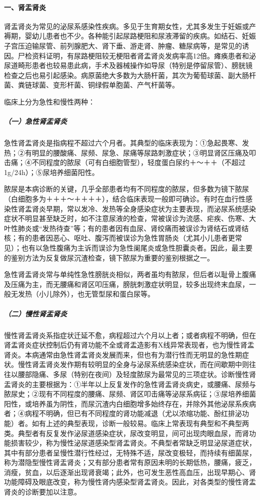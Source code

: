\paragraph{一、肾盂肾炎}

肾盂肾炎为常见的泌尿系感染性疾病。多见于生育期女性，尤其多发生于妊娠或产褥期，婴幼儿患者也不少。各种能引起尿路梗阻和尿液滞留的疾病。如结石、妊娠子宫压迫输尿管、前列腺肥大、肾下垂、游走肾、肿瘤、糖尿病等，是常见的诱因。尸检资料证明，有尿路梗阻较无梗阻者肾盂肾炎发病率高12倍。瘫痪患者和泌尿道畸形患者也较易患此病，手术及器械操作如导尿（特别是停留尿管）、膀胱镜检查之后也易引起感染。病原菌绝大多数为大肠杆菌，其次为葡萄球菌、副大肠杆菌、粪链球菌、变形杆菌、铜绿假单胞菌、产气杆菌等。

临床上分为急性和慢性两种：

\subparagraph{（一）急性肾盂肾炎}

急性肾盂肾炎是指病程不超过六个月者。其典型的临床表现为：①急起畏寒、发热；②有明显的腰酸痛、尿频、尿急、尿痛等尿路刺激症状；③明显肾区压痛及叩击痛；④不同程度的脓尿（可有白细胞管型），轻度蛋白尿约＋～＋＋（不超过1g/24h）；⑤尿培养细菌阳性。

脓尿是本病诊断的关键，几乎全部患者均有不同程度的脓尿，但多数为镜下脓尿（白细胞多为＋＋＋～＋＋＋＋），结合临床表现一般即可确诊。有时在血行性感染性肾盂肾炎早期，常以发冷、发热等全身感染症状为主要表现，而泌尿系统感染症状不明显甚至缺乏时，如不注意尿液的检查，常被误诊为流感、疟疾、伤寒、大叶性肺炎或“发热待查”等；有的患者因有血尿、肾绞痛而被误诊为肾结石或肾结核；有的患者因恶心、呕吐、腹泻而被误诊为急性胃肠炎（尤其小儿患者更常见）；也有以急性腹痛为主诉而误诊为急性阑尾炎或急性胆囊炎者。因此，最主要的鉴别方法为反复做尿沉渣检查，镜下脓尿为重要的鉴别根据之一。

急性肾盂肾炎常与单纯性急性膀胱炎相似，两者虽均有脓尿，但后者以耻骨上腹痛及压痛为主，而无腰痛和肾区叩压痛，膀胱刺激症状明显，较多出现终末血尿，一般无发热（小儿除外），也无管型尿和蛋白尿等。

\subparagraph{（二）慢性肾盂肾炎}

慢性肾盂肾炎系指症状迁延不愈，病程超过六个月以上者；或者病程不明确，但在肾盂肾炎症状控制后仍有肾功能不全或肾盂造影有X线异常表现者，也为慢性肾盂肾炎。本病通常由急性肾盂肾炎发展而来，但也有为潜行性而无明显的急性期症状。慢性肾盂肾炎发作期有较明显的全身与泌尿系统感染症状，而在间歇期中则往往以腰部隐痛、多尿（特别在夜间）及轻度脓尿为最常见的三项症状。诊断慢性肾盂肾炎的主要根据为：①半年以上反复发作的急性肾盂肾炎病史，或腰痛、尿频与脓尿史；②现有不同程度的腰痛、尿频、肾区叩击痛等泌尿系病征；③尿培养细菌阳性，或培养虽为阴性，而尿沉渣内白细胞增多始终存在，并除外其他泌尿系疾病者；④病程不明确，但已有不同程度的肾功能减退（尤以浓缩功能、酚红排泌功能）者。如有上述的典型表现，诊断一般较易。临床上常表现有典型和不典型两类。典型者有反复发作泌尿道感染症状，尿改变明显，间可出现肉眼血尿，而肾功能损害较少，称为慢性泌尿道感染型肾盂肾炎。不典型者常缺乏明显泌尿道症状，其中有部分患者呈慢性潜行性经过，无特殊不适，尿改变极轻，而持续有细菌尿，称为潜隐型慢性肾盂肾炎；又有部分患者常有原因未明的长期低热，腰痛，疲乏，消瘦，贫血，以后逐渐出现肾衰竭；此外，也可发生恶性高血压，出现早期心、肾功能障碍及眼底改变，称为慢性肾内感染型肾盂肾炎。因此，对各类型的慢性肾盂肾炎的诊断要加以注意。


